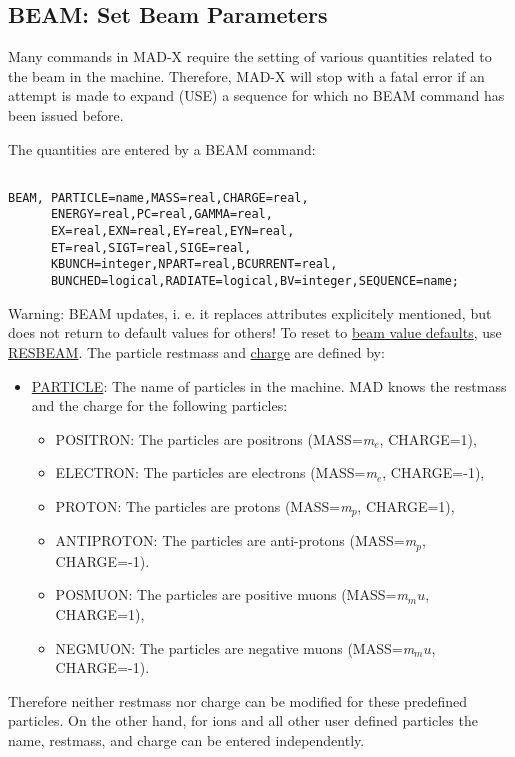



	\subsection{BEAM: Set Beam Parameters}

 Many commands in MAD-X require the setting of various quantities related to the beam in the machine. Therefore, MAD-X will stop with a fatal error if an attempt is made to expand (USE) a sequence for which no BEAM command has been issued before. 

 The quantities are entered by a BEAM command: 
\begin{verbatim}

BEAM, PARTICLE=name,MASS=real,CHARGE=real,
      ENERGY=real,PC=real,GAMMA=real,
      EX=real,EXN=real,EY=real,EYN=real,
      ET=real,SIGT=real,SIGE=real,
      KBUNCH=integer,NPART=real,BCURRENT=real,
      BUNCHED=logical,RADIATE=logical,BV=integer,SEQUENCE=name;
\end{verbatim} Warning: BEAM updates, i. e. it replaces attributes explicitely mentioned, but does not return to default values for others! To reset to \href{resbeam.html#defaults}{beam value defaults},  use \href{resbeam.html}{RESBEAM}. The particle restmass and \href{charge}{charge} are defined by: 
\begin{itemize}
	\item \href{particle}{PARTICLE}: The name of particles in the machine. MAD knows the restmass and the charge for the following particles: 
\begin{itemize}
	\item POSITRON: The particles are positrons (MASS=\textit{m$_e$}, CHARGE=1), 
	\item ELECTRON: The particles are electrons (MASS=\textit{m$_e$}, CHARGE=-1), 
	\item PROTON: The particles are protons (MASS=\textit{m$_p$}, CHARGE=1), 
	\item ANTIPROTON: The particles are anti-protons (MASS=\textit{m$_p$}, CHARGE=-1). 
	\item POSMUON: The particles are positive muons (MASS=\textit{m$_mu$}, CHARGE=1), 
	\item NEGMUON: The particles are negative muons (MASS=\textit{m$_mu$}, CHARGE=-1). 
\end{itemize}
\end{itemize} Therefore neither restmass nor charge can be modified for these predefined particles. On the other hand, for ions and all other user defined particles the name, restmass, and charge can be entered independently. 

